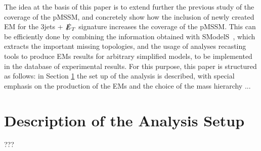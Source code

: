 \documentclass[a4paper,11pt]{article}
\newcommand{\SMO}{{\sc SModelS}}
\begin{document}
The idea at the basis of this paper is to extend further the previous study of the coverage of the pMSSM, and concretely show how the inclusion of newly created EM for the 3jets + $\slashed{E}_T$ signature increases the coverage of the pMSSM. This can be efficiently done by combining the information obtained with \SMO~, which extracts the important missing topologies, and the usage of analyses recasting tools to produce EMs results for arbitrary simplified models, to be implemented in the database of experimental results. For this purpose, this paper is structured as follows: in Section \ref{sec::setup} the set up of the analysis is described, with special emphasis on the production of the EMs and the choice of the mass hierarchy ... 


\section{Description of the Analysis Setup}\label{sec::setup}
{\color{blue} ??? }
\end{document}
